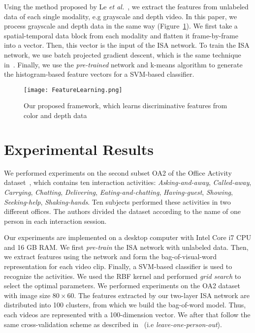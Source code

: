 \documentclass{article}
\begin{document}
Using the method proposed by Le \textit{et al.}~\cite{2011_Le_ISA}, we extract the features from unlabeled data of each single modality, e.g grayscale and depth video.
In this paper, we process grayscale and depth data in the same way (Figure~\ref{fig:featurelearning}).
We first take a spatial-temporal data block from each modality and flatten it frame-by-frame into a vector.
Then, this vector is the input of the ISA network.
To train the ISA network, we use batch projected gradient descent, which is the same technique in~\cite{2011_Le_ISA}.
Finally, we use the \textit{pre-trained} network and k-means algorithm to generate the histogram-based feature vectors for a SVM-based classifier.

\begin{figure}[!htb]
	\centering
	\texttt{[image: FeatureLearning.png]}
	\caption{Our proposed framework, which learns discriminative features from color and depth data}
	\label{fig:featurelearning}
\end{figure}

\section{Experimental Results}
\label{sec:results}

We performed experiments on the second subset OA2 of the Office Activity dataset~\cite{2014_Wang_ConvolutionalNetworks}, which contains ten interaction activities: \textit{Asking-and-away}, \textit{Called-away}, \textit{Carrying}, \textit{Chatting}, \textit{Delivering}, \textit{Eating-and-chatting}, \textit{Having-guest}, \textit{Showing}, \textit{Seeking-help}, \textit{Shaking-hands}.
Ten subjects performed these activities in two different offices.
The authors divided the dataset according to the name of one person in each interaction session.

Our experiments are implemented on a desktop computer with Intel Core i7 CPU and 16 GB RAM.
We first \textit{pre-train} the ISA network with unlabeled data.
Then, we extract features using the network and form the bag-of-visual-word representation for each video clip.
Finally, a SVM-based classifier is used to recognize the activities.
We used the RBF kernel and performed \textit{grid search} to select the optimal parameters.
We performed experiments on the OA2 dataset~\cite{2014_Wang_ConvolutionalNetworks} with image size $80\times60$.
The features extracted by our two-layer ISA network are distributed into 100 clusters, from which we build the bag-of-word model.
Thus, each videos are represented with a 100-dimension vector.
We after that follow the same cross-validation scheme as described in~\cite{2014_Wang_ConvolutionalNetworks} (i.e \textit{leave-one-person-out}).
\end{document}
